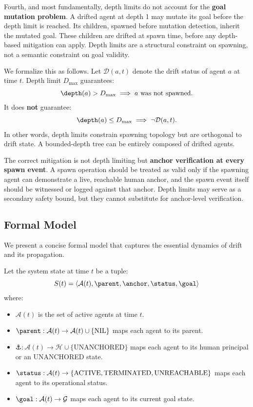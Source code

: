Fourth, and most fundamentally, depth limits do not account for the \textbf{goal mutation problem}. A drifted agent at depth 1 may mutate its goal before the depth limit is reached. Its children, spawned before mutation detection, inherit the mutated goal. These children are drifted at spawn time, before any depth-based mitigation can apply. Depth limits are a structural constraint on spawning, not a semantic constraint on goal validity.

We formalize this as follows. Let $\mathcal{D}(a, t)$ denote the drift status of agent $a$ at time $t$. Depth limit $D_{\max}$ guarantees:
\[
\depth(a) > D_{\max} \implies a \text{ was not spawned.}
\]
It does \textbf{not} guarantee:
\[
\depth(a) \leq D_{\max} \implies \neg \mathcal{D}(a, t).
\]
In other words, depth limits constrain spawning topology but are orthogonal to drift state. A bounded-depth tree can be entirely composed of drifted agents.

The correct mitigation is not depth limiting but \textbf{anchor verification at every spawn event}. A spawn operation should be treated as valid only if the spawning agent can demonstrate a live, reachable human anchor, and the spawn event itself should be witnessed or logged against that anchor. Depth limits may serve as a secondary safety bound, but they cannot substitute for anchor-level verification.

\subsection{Formal Model}

We present a concise formal model that captures the essential dynamics of drift and its propagation.

Let the system state at time $t$ be a tuple:
\[
S(t) = \langle \mathcal{A}(t), \parent, \anchor, \status, \goal \rangle
\]
where:
\begin{itemize}
    \item $\mathcal{A}(t)$ is the set of active agents at time $t$.
    \item $\parent: \mathcal{A}(t) \rightarrow \mathcal{A}(t) \cup \{\text{NIL}\}$ maps each agent to its parent.
    \item $\anchor: \mathcal{A}(t) \rightarrow \mathcal{H} \cup \{\text{UNANCHORED}\}$ maps each agent to its human principal or an UNANCHORED state.
    \item $\status: \mathcal{A}(t) \rightarrow \{\text{ACTIVE}, \text{TERMINATED}, \text{UNREACHABLE}\}$ maps each agent to its operational status.
    \item $\goal: \mathcal{A}(t) \rightarrow \mathcal{G}$ maps each agent to its current goal state.
\end{itemize}

